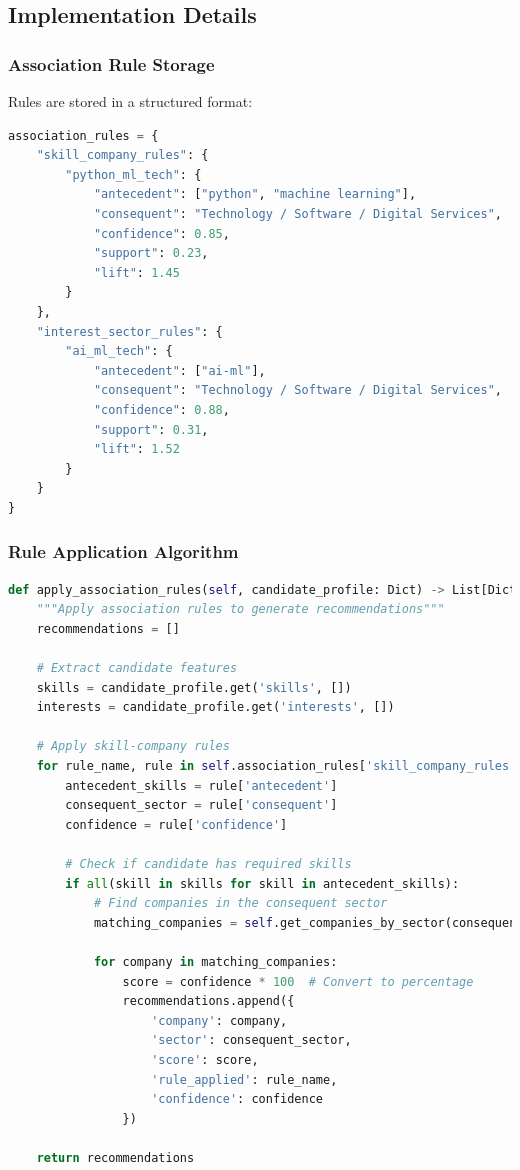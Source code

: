\documentclass[12pt,a4paper]{article}
\begin{document}
\subsection{Implementation Details}

\subsubsection{Association Rule Storage}
Rules are stored in a structured format:

\begin{lstlisting}[language=Python, caption=Association Rule Storage Structure]
association_rules = {
    "skill_company_rules": {
        "python_ml_tech": {
            "antecedent": ["python", "machine learning"],
            "consequent": "Technology / Software / Digital Services",
            "confidence": 0.85,
            "support": 0.23,
            "lift": 1.45
        }
    },
    "interest_sector_rules": {
        "ai_ml_tech": {
            "antecedent": ["ai-ml"],
            "consequent": "Technology / Software / Digital Services",
            "confidence": 0.88,
            "support": 0.31,
            "lift": 1.52
        }
    }
}
\end{lstlisting}

\subsubsection{Rule Application Algorithm}
\begin{lstlisting}[language=Python, caption=Rule Application Algorithm]
def apply_association_rules(self, candidate_profile: Dict) -> List[Dict]:
    """Apply association rules to generate recommendations"""
    recommendations = []
    
    # Extract candidate features
    skills = candidate_profile.get('skills', [])
    interests = candidate_profile.get('interests', [])
    
    # Apply skill-company rules
    for rule_name, rule in self.association_rules['skill_company_rules'].items():
        antecedent_skills = rule['antecedent']
        consequent_sector = rule['consequent']
        confidence = rule['confidence']
        
        # Check if candidate has required skills
        if all(skill in skills for skill in antecedent_skills):
            # Find companies in the consequent sector
            matching_companies = self.get_companies_by_sector(consequent_sector)
            
            for company in matching_companies:
                score = confidence * 100  # Convert to percentage
                recommendations.append({
                    'company': company,
                    'sector': consequent_sector,
                    'score': score,
                    'rule_applied': rule_name,
                    'confidence': confidence
                })
    
    return recommendations
\end{lstlisting}
\end{document}
